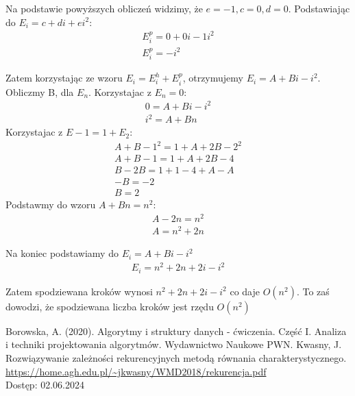 \documentclass[12pt,oneside,a4paper]{book} %
\theoremstyle{break}
\begin{document}
Na podstawie powyższych obliczeń widzimy, że $e=-1, c=0, d=0$.
Podstawiając do $E_i=c+di+ei^2$:
\begin{align*}
  E_i^p=0+0i-1i^2\\
  E_i^p=-i^2
\end{align*}

Zatem korzystając ze wzoru $E_i=E_i^h+E_i^p$, otrzymujemy $E_i=A+Bi-i^2$.
Obliczmy B, dla $E_n$. Korzystajac z $E_n=0$:
\begin{align*}
  0=A+Bi-i^2\\
  i^2=A+Bn
\end{align*}
Korzystajac z $E-1=1+E_2$:
\begin{align*}
  A+B-1^2=1+A+2B-2^2\\
  A+B-1=1+A+2B-4\\
  B-2B=1+1-4+A-A\\
  -B=-2\\
  B=2
\end{align*}
Podstawmy do wzoru $A+Bn=n^2$:
\begin{align*}
  A-2n=n^2\\
  A=n^2+2n
\end{align*}

Na koniec podstawiamy do $E_i=A+Bi-i^2$
\begin{align*}
  E_i=n^2+2n+2i-i^2
\end{align*}

Zatem spodziewana kroków wynosi $n^2+2n+2i-i^2$ co daje $O(n^2)$.
To zaś dowodzi, że spodziewana liczba kroków jest rzędu $O(n^2)$

\begin{thebibliography}{00}
  Borowska, A. (2020). Algorytmy i struktury danych - ćwiczenia. Część I. Analiza i techniki projektowania algorytmów. Wydawnictwo Naukowe PWN.
  Kwasny, J. Rozwiązywanie zależności rekurencyjnych metodą
  równania charakterystycznego. \url{https://home.agh.edu.pl/~jkwasny/WMD2018/rekurencja.pdf}\\
  Dostęp: 02.06.2024
\end{thebibliography}
\end{document}
